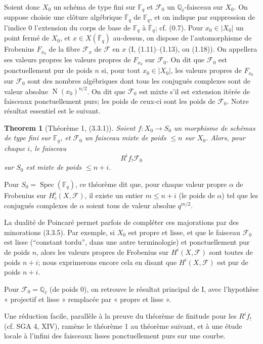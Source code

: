 \documentclass[11pt]{article}
\newtheorem{theorem}{Theorem}
\theoremstyle{remark}
\newcommand{\Ql}{\mathbb{Q}_\ell}
\newcommand{\Fq}{\mathbb{F}_q}
\newcommand{\Fbar}{\overline{\mathbb{F}}_q}
\newcommand{\Spec}{\operatorname{Spec}}
\newcommand{\Norm}{\operatorname{N}}
\begin{document}
Soient donc $X_0$ un schéma de type fini sur $\Fq$ et $\mathcal F_0$ un $\Ql$-faisceau sur $X_0$. On suppose choisie une clôture algébrique $\Fbar$ de $\Fq$, et on indique par suppression de l'indice $0$ l'extension du corps de base de $\Fq$ à $\Fbar$; cf. (0.7). Pour $x_0\in |X_0|$ un point fermé de $X_0$, et $x\in X(\Fbar)$ au-dessus, on dispose de l'automorphisme de Frobenius $F_{x_0}$ de la fibre $\mathcal F_x$ de $\mathcal F$ en $x$ (I, (1.11)--(1.13), ou (1.18)). On appellera ses valeurs propres les valeurs propres de $F_{x_0}$ sur $\mathcal F_0$. On dit que $\mathcal F_0$ est ponctuellement pur de poids $n$ si, pour tout $x_0\in |X_0|$, les valeurs propres de $F_{x_0}$ sur $\mathcal F_0$ sont des nombres algébriques dont tous les conjugués complexes sont de valeur absolue $\Norm(x_0)^{n/2}$. On dit que $\mathcal F_0$ est mixte s'il est extension itérée de faisceaux ponctuellement purs; les poids de ceux-ci sont les poids de $\mathcal F_0$. Notre résultat essentiel est le suivant.

\begin{theorem}[Théorème 1, (3.3.1)]
Soient $f:X_0\to S_0$ un morphisme de schémas de type fini sur $\Fq$, et $\mathcal F_0$ un faisceau mixte de poids $\le n$ sur $X_0$. Alors, pour chaque $i$, le faisceau
\[
R^i f_!\mathcal F_0
\]
sur $S_0$ est mixte de poids $\le n+i$.
\end{theorem}

Pour $S_0=\Spec(\Fq)$, ce théorème dit que, pour chaque valeur propre $\alpha$ de Frobenius sur $H^i_c(X,\mathcal F)$, il existe un entier $m\le n+i$ (le poids de $\alpha$) tel que les conjugués complexes de $\alpha$ soient tous de valeur absolue $q^{m/2}$.

La dualité de Poincaré permet parfois de compléter ces majorations par des minorations (3.3.5). Par exemple, si $X_0$ est propre et lisse, et que le faisceau $\mathcal F_0$ est lisse (``constant tordu'', dans une autre terminologie) et ponctuellement pur de poids $n$, alors les valeurs propres de Frobenius sur $H^i(X,\mathcal F)$ sont toutes de poids $n+i$; nous exprimerons encore cela en disant que $H^i(X,\mathcal F)$ est pur de poids $n+i$.

Pour $\mathcal F_0=\Ql$ (de poids $0$), on retrouve le résultat principal de I, avec l'hypothèse « projectif et lisse » remplacée par « propre et lisse ».

Une réduction facile, parallèle à la preuve du théorème de finitude pour les $R^i f_!$ (cf. SGA 4, XIV), ramène le théorème 1 au théorème suivant, et à une étude locale à l'infini des faisceaux lisses ponctuellement purs sur une courbe.
\end{document}
